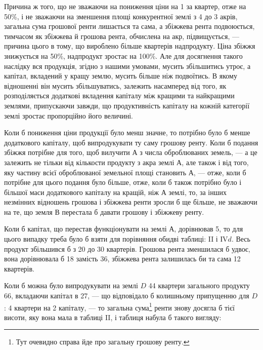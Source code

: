 
Причина ж того, що не зважаючи на пониження ціни на 1
за квартер, отже на 50\%, і не зважаючи на зменшення площі конкурентної
землі з 4 до 3 акрів, загальна сума грошової ренти лишається та сама, а збіжжева
рента подвоюється, тимчасом як збіжжева й грошова рента, обчислена на акр, підвищується,
— причина цього в тому, що вироблено більше квартерів надпродукту.
Ціна збіжжя знижується на 50\%, надпродукт зростає на 100\%.
Але для досягнення такого наслідку вся продукція, згідно з нашими умовами,
мусить збільшитись утроє, а капітал, вкладений у кращу землю, мусить більше
ніж подвоїтись. В якому відношенні він мусить збільшуватись, залежить насамперед
від того, як розподіляється додаткові вкладення капіталу між кращими та
найкращими землями, припускаючи завжди, що продуктивність капіталу на
кожній категорії землі зростає пропорційно його величині.

Коли б пониження ціни продукції було менш значне, то потрібно було б
менше додаткового капіталу, щоб випродукувати ту саму грошову ренту. Коли б
подання збіжжя потрібне для того, щоб вилучити $А$ з числа оброблюваних земель,
— а це залежить не тільки від кількости продукту з акра землі $А$, але
також і від того, яку частину всієї оброблюваної земельної площі становить $А$, —
отже, коли б потрібне для цього подання було більше, отже, коли б також
потрібно було і більшої маси додаткового капіталу на кращій, ніж $А$ землі, то,
за інших незмінних відношень грошова і збіжжева ренти зросли б ще більше,
не зважаючи на те, що земля $В$ перестала б давати грошову і збіжжеву ренту.

Коли б капітал, що перестав функціонувати на землі $А$, дорівнював 5, то для цього випадку треба було б взяти для порівняння обидві таблиці:
II і ІV$d$. Весь продукт збільшився б з 20 до 30 квартерів. Грошова рента
зменшилася б удвоє, вона дорівнювала б 18 замість 36,
збіжжева рента залишилась би та сама \deq{} 12 квартерів.

Коли б можна було випродукувати на землі $D$ 44 квартери загального
продукту \deq{} 66, вкладаючи капітал в 27, — що відповідало б
колишньому припущенню для $D$: 4 квартери на 2 капіталу, —
то загальна сума\footnote*{
Тут очевидно справа йде про загальну грошову ренту. 
} ренти знову досягла б тієї висоти, яку вона мала в таблиці
II, і таблиця набула б такого вигляду:

